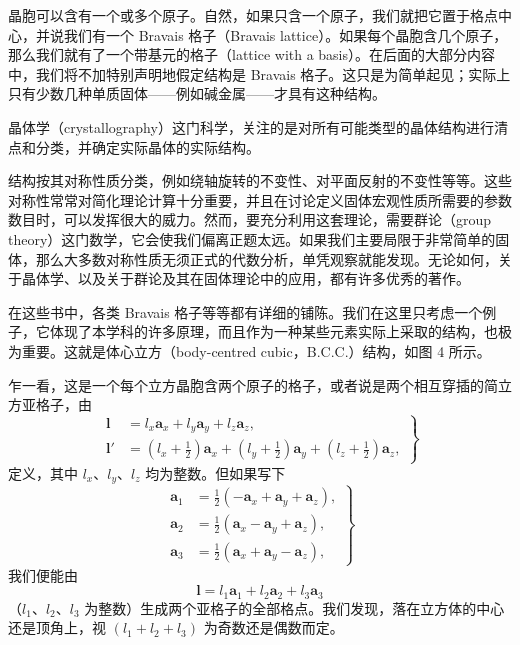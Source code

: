 晶胞可以含有一个或多个原子。自然，如果只含一个原子，我们就把它置于格点中心，并说我们有一个 Bravais 格子（Bravais lattice）。如果每个晶胞含几个原子，那么我们就有了一个带基元的格子（lattice with a basis）。在后面的大部分内容中，我们将不加特别声明地假定结构是 Bravais 格子。这只是为简单起见；实际上只有少数几种单质固体——例如碱金属——才具有这种结构。

晶体学（crystallography）这门科学，关注的是对所有可能类型的晶体结构进行清点和分类，并确定实际晶体的实际结构。


结构按其对称性质分类，例如绕轴旋转的不变性、对平面反射的不变性等等。这些对称性常常对简化理论计算十分重要，并且在讨论定义固体宏观性质所需要的参数数目时，可以发挥很大的威力。然而，要充分利用这套理论，需要群论（group theory）这门数学，它会使我们偏离正题太远。如果我们主要局限于非常简单的固体，那么大多数对称性质无须正式的代数分析，单凭观察就能发现。无论如何，关于晶体学、以及关于群论及其在固体理论中的应用，都有许多优秀的著作。

在这些书中，各类 Bravais 格子等等都有详细的铺陈。我们在这里只考虑一个例子，它体现了本学科的许多原理，而且作为一种某些元素实际上采取的结构，也极为重要。这就是体心立方（body-centred cubic，B.C.C.）结构，如图 4 所示。



乍一看，这是一个每个立方晶胞含两个原子的格子，或者说是两个相互穿插的简立方亚格子，由
\begin{equation*}
\left.
\begin{aligned}
\boldsymbol{l} &= l_x\mathbf{a}_x + l_y\mathbf{a}_y + l_z\mathbf{a}_z, \\
\boldsymbol{l}' &= \left(l_x + \tfrac{1}{2}\right)\mathbf{a}_x + \left(l_y + \tfrac{1}{2}\right)\mathbf{a}_y + \left(l_z + \tfrac{1}{2}\right)\mathbf{a}_z,
\end{aligned}
\right\}
\tag{1.2}
\end{equation*}
定义，其中 $l_x$、$l_y$、$l_z$ 均为整数。但如果写下
\begin{equation*}
\left.
\begin{aligned}
\mathbf{a}_1 &= \tfrac{1}{2}\left(-\mathbf{a}_x + \mathbf{a}_y + \mathbf{a}_z\right), \\
\mathbf{a}_2 &= \tfrac{1}{2}\left(\mathbf{a}_x - \mathbf{a}_y + \mathbf{a}_z\right), \\
\mathbf{a}_3 &= \tfrac{1}{2}\left(\mathbf{a}_x + \mathbf{a}_y - \mathbf{a}_z\right),
\end{aligned}
\right\}
\tag{1.3}
\end{equation*}
我们便能由
\begin{equation*}
\boldsymbol{l} = l_1\mathbf{a}_1 + l_2\mathbf{a}_2 + l_3\mathbf{a}_3
\tag{1.4}
\end{equation*}
（$l_1$、$l_2$、$l_3$ 为整数）生成两个亚格子的全部格点。我们发现，落在立方体的中心还是顶角上，视 $(l_1+l_2+l_3)$ 为奇数还是偶数而定。

